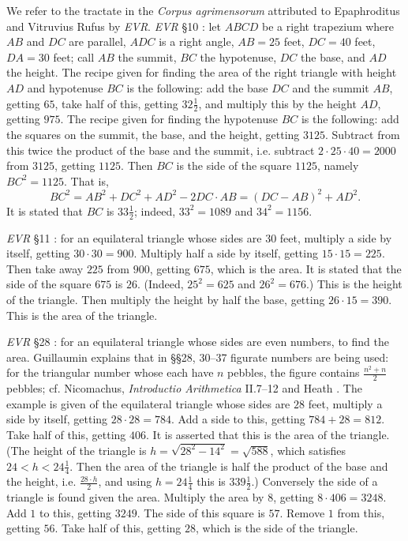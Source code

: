 We refer to the tractate in the {\em Corpus agrimensorum} attributed to Epaphroditus and Vitruvius Rufus by {\em EVR}. {\em EVR}  
\S 10 \cite[pp.~140--141]{guillaumin}: let $ABCD$ be a right trapezium where $AB$ and $DC$ are parallel, $ADC$ is a right angle,
$AB=25$ feet, $DC=40$ feet, $DA=30$ feet; call $AB$ the summit, $BC$ the hypotenuse, $DC$ the base, and $AD$ the height.
The recipe given for finding the area
of the right triangle with height $AD$ and hypotenuse $BC$ is the following:
add the base $DC$ and the summit $AB$, getting $65$,  take half of this, getting $32 \frac{1}{2}$, and multiply this
by the height $AD$, getting $975$. The recipe given for finding the
hypotenuse $BC$ is the following: add the 
squares on the summit, the base, and the height, getting $3125$. 
Subtract from this twice the product of the base and the summit, i.e. subtract $2 \cdot 25 \cdot 40 = 2000$ from $3125$, getting $1125$. Then $BC$ is the side
of the square $1125$, namely $BC^2=1125$. That is, 
\[
BC^2 = AB^2+DC^2+AD^2 - 2  DC \cdot AB = (DC-AB)^2 + AD^2.
\]
It is stated that $BC$ is $33 \frac{1}{2}$; indeed, $33^2=1089$ and $34^2=1156$.

{\em EVR} \S 11 \cite[pp.~140--143]{guillaumin}: for an equilateral triangle whose sides are $30$ feet,
multiply a side by itself, getting $30\cdot 30 = 900$. Multiply half a side by itself, getting $15\cdot 15 = 225$. Then take away $225$ from
$900$, getting $675$, which is the area. It is stated that the side of the square $675$ is $26$. (Indeed, $25^2=625$ and $26^2=676$.)
This is the height of the triangle.
Then multiply  the height by half the base, getting $26\cdot 15 = 390$. This is the area of the triangle.

{\em EVR} \S 28 \cite[pp.~158--163]{guillaumin}: for an equilateral triangle whose sides are even numbers,
to find the area. Guillaumin explains that in \S \S 28, 30--37 
figurate numbers are being used:
for the triangular number whose each have $n$ pebbles, the figure contains $\frac{n^2+n}{2}$ pebbles; cf.
Nicomachus, {\em Introductio Arithmetica} II.7--12 \cite[pp~239--249]{nicomachus} and Heath \cite[p.~76]{HGMI}. 
The example is given of the equilateral triangle whose sides are $28$ feet, 
multiply a side by itself, getting $28\cdot 28=784$. Add a side to this, getting $784+28=812$. Take half of this, getting $406$. It is asserted that this
is the area of the triangle. (The height of the triangle is $h=\sqrt{28^2-14^2}=\sqrt{588}$, which satisfies $24<h<24 \frac{1}{4}$. 
Then the area of the triangle is half the product of the base and the height, i.e. $\frac{28\cdot h}{2}$, and using $h=24 \frac{1}{4}$ this is
$339 \frac{1}{2}$.)
Conversely the side of a triangle is found given the area.
Multiply the area by $8$, getting $8\cdot 406 = 3248$. Add $1$ to this, getting $3249$. The side of this square is 
$57$. Remove $1$ from this, getting $56$. Take half of this, getting $28$, which is the side of the triangle. 

